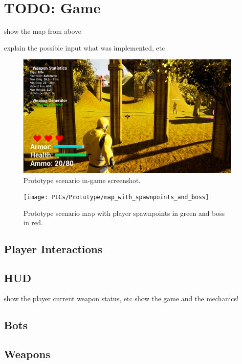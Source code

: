 \documentclass[MGS,Master,english]{twbook}%
\begin{document}
\section{TODO: Game}
show the map from above

explain the possible input
what was implemented, etc
\begin{figure}[!ht]
	\centering
	\includegraphics[width=1.0\linewidth]{PICs/Prototype/ingame_screenshot}
	\caption{Prototype scenario in-game screenshot.}
\end{figure}

\begin{figure}[!ht]
	\centering
	\texttt{[image: PICs/Prototype/map\_with\_spawnpoints\_and\_boss]}
	\caption{Prototype scenario map with player spawnpoints in green and boss in red.}
\end{figure}


\subsection{Player Interactions}

\subsection{HUD}
show the player current weapon status, etc
show the game and the mechanics!

\subsection{Bots}

\subsection{Weapons}
\end{document}
